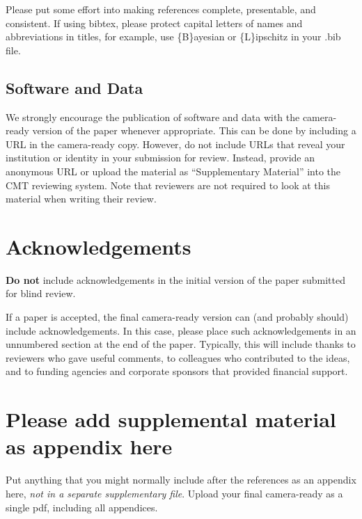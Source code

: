 \documentclass{article}
\begin{document}
Please put some effort into making references complete, presentable, and
consistent. If using bibtex, please protect capital letters of names and
abbreviations in titles, for example, use \{B\}ayesian or \{L\}ipschitz
in your .bib file.

\subsection{Software and Data}

We strongly encourage the publication of software and data with the
camera-ready version of the paper whenever appropriate. This can be
done by including a URL in the camera-ready copy. However, do not
include URLs that reveal your institution or identity in your
submission for review. Instead, provide an anonymous URL or upload
the material as ``Supplementary Material'' into the CMT reviewing
system. Note that reviewers are not required to look at this material
when writing their review.

\section*{Acknowledgements}

\textbf{Do not} include acknowledgements in the initial version of
the paper submitted for blind review.

If a paper is accepted, the final camera-ready version can (and
probably should) include acknowledgements. In this case, please
place such acknowledgements in an unnumbered section at the
end of the paper. Typically, this will include thanks to reviewers
who gave useful comments, to colleagues who contributed to the ideas,
and to funding agencies and corporate sponsors that provided financial
support.


\nocite{langley00}





\appendix
\section{Please add supplemental material as appendix here}
%
Put anything that you might normally include after the references as an appendix here, {\it not in a separate supplementary file}. Upload your final camera-ready as a single pdf, including all appendices.

\end{document}
